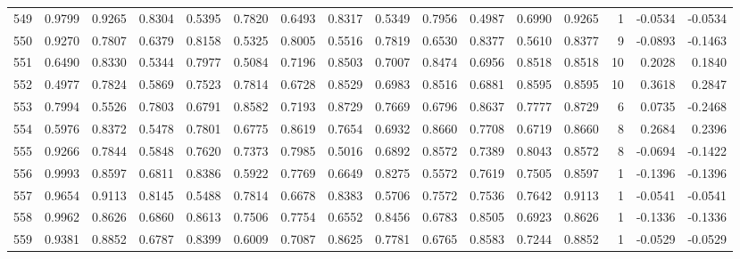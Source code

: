 \begin{tabular}{lrrrrrrrrrrrrrrr}
549 &      0.9799 &  0.9265 &  0.8304 &  0.5395 &  0.7820 &  0.6493 &  0.8317 &  0.5349 &  0.7956 &  0.4987 &   0.6990 &     0.9265 &      1 &                   -0.0534 &                    -0.0534 \\
550 &      0.9270 &  0.7807 &  0.6379 &  0.8158 &  0.5325 &  0.8005 &  0.5516 &  0.7819 &  0.6530 &  0.8377 &   0.5610 &     0.8377 &      9 &                   -0.0893 &                    -0.1463 \\
551 &      0.6490 &  0.8330 &  0.5344 &  0.7977 &  0.5084 &  0.7196 &  0.8503 &  0.7007 &  0.8474 &  0.6956 &   0.8518 &     0.8518 &     10 &                    0.2028 &                     0.1840 \\
552 &      0.4977 &  0.7824 &  0.5869 &  0.7523 &  0.7814 &  0.6728 &  0.8529 &  0.6983 &  0.8516 &  0.6881 &   0.8595 &     0.8595 &     10 &                    0.3618 &                     0.2847 \\
553 &      0.7994 &  0.5526 &  0.7803 &  0.6791 &  0.8582 &  0.7193 &  0.8729 &  0.7669 &  0.6796 &  0.8637 &   0.7777 &     0.8729 &      6 &                    0.0735 &                    -0.2468 \\
554 &      0.5976 &  0.8372 &  0.5478 &  0.7801 &  0.6775 &  0.8619 &  0.7654 &  0.6932 &  0.8660 &  0.7708 &   0.6719 &     0.8660 &      8 &                    0.2684 &                     0.2396 \\
555 &      0.9266 &  0.7844 &  0.5848 &  0.7620 &  0.7373 &  0.7985 &  0.5016 &  0.6892 &  0.8572 &  0.7389 &   0.8043 &     0.8572 &      8 &                   -0.0694 &                    -0.1422 \\
556 &      0.9993 &  0.8597 &  0.6811 &  0.8386 &  0.5922 &  0.7769 &  0.6649 &  0.8275 &  0.5572 &  0.7619 &   0.7505 &     0.8597 &      1 &                   -0.1396 &                    -0.1396 \\
557 &      0.9654 &  0.9113 &  0.8145 &  0.5488 &  0.7814 &  0.6678 &  0.8383 &  0.5706 &  0.7572 &  0.7536 &   0.7642 &     0.9113 &      1 &                   -0.0541 &                    -0.0541 \\
558 &      0.9962 &  0.8626 &  0.6860 &  0.8613 &  0.7506 &  0.7754 &  0.6552 &  0.8456 &  0.6783 &  0.8505 &   0.6923 &     0.8626 &      1 &                   -0.1336 &                    -0.1336 \\
559 &      0.9381 &  0.8852 &  0.6787 &  0.8399 &  0.6009 &  0.7087 &  0.8625 &  0.7781 &  0.6765 &  0.8583 &   0.7244 &     0.8852 &      1 &                   -0.0529 &                    -0.0529 \\

\end{tabular}
